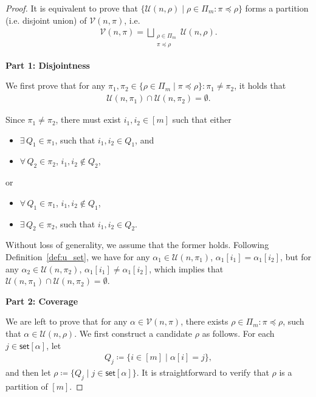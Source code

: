\documentclass[twoside,11pt]{article}
\def\calV{\mathcal{V}}
\newcommand{\sPi}{\pi}
\newcommand{\uset}{\calU}
\newcommand{\usetnm}[2]{\uset\left(#1,#2\right)}
\newcommand{\vset}{\calV}
\newcommand{\vsetp}[2]{\vset(#1,#2)}
\newcommand{\takesetp}[1]{\mathsf{set}[#1]}
\newcommand{\partition}{\Pi}
\newcommand{\partitionp}[1]{\partition_{#1}}
\newcommand{\pleq}{\preceq}
\def\calU{\mathcal{U}}
\begin{document}
\begin{proof}
It is equivalent to prove that $\{\usetnm{n}{\rho} \mid \rho \in \partitionp{m}: \sPi \pleq \rho\}$ forms a partition (i.e. disjoint union) of $\vsetp{n}{\sPi}$, i.e.
\begin{align*}
\vsetp{n}{\sPi} = \bigsqcup_{\substack{\rho \in \partitionp{m} \\ \sPi \pleq \rho} }\usetnm{n}{\rho}.
\end{align*}

    {\bf Part 1: Disjointness}
    
    We first prove that for any $\pi_1, \pi_2 \in \{\rho \in \partitionp{m} \mid \sPi \pleq \rho \}: \pi_1 \neq \pi_2$, it holds that
    \begin{align*}
        \usetnm{n}{\pi_1} \cap \usetnm{n}{\pi_2} = \emptyset. 
    \end{align*}

    Since $\pi_1 \neq \pi_2$, there must exist $i_1, i_2 \in [m]$ such that either
    \begin{itemize}
        \item $\exists \, Q_1 \in \pi_1$, such that $i_1, i_2 \in Q_1$, and
        \item $\forall \, Q_2 \in \pi_2$, $i_1, i_2 \notin Q_2$, 
    \end{itemize}
    or 
    \begin{itemize}
        \item $\forall \, Q_1 \in \pi_1$, $i_1, i_2 \notin Q_1$, 
        \item $\exists \, Q_2 \in \pi_2$, such that $i_1, i_2 \in Q_2$.  
    \end{itemize}
    Without loss of generality, we assume that the former holds. Following Definition~\ref{def:u_set}, we have for any $\alpha_1 \in \usetnm{n}{\pi_1}$, $\alpha_1[i_1] = \alpha_1[i_2]$, but for any $\alpha_2 \in \usetnm{n}{\pi_2}$, $\alpha_1[i_1] \neq \alpha_1[i_2]$, which implies that $\usetnm{n}{\pi_1} \cap \usetnm{n}{\pi_2} = \emptyset$. 

    {\bf Part 2: Coverage}

    We are left to prove that for any $\alpha \in \vsetp{n}{\sPi}$, there exists $\rho \in \partitionp{m}: \sPi \pleq \rho$, such that $\alpha \in \usetnm{n}{\rho}$. We first construct a candidate $\rho$ as follows. For each $j \in \takesetp{\alpha}$, let
    \begin{align*}
    Q_j \coloneqq \{i \in [m] \mid \alpha[i] = j\},
    \end{align*}
    and then let $\rho \coloneqq \{Q_j \mid j \in \takesetp{\alpha}\}$. It is straightforward to verify that $\rho$ is a partition of $[m]$. 
    

\end{proof}
\end{document}
